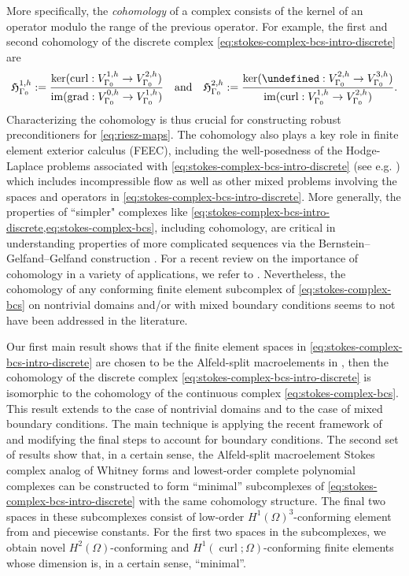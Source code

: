 \documentclass{mcom-l}
\theoremstyle{definition}
\theoremstyle{remark}
\numberwithin{equation}{section}
\let\div\undefined
\DeclareMathOperator{\curl}{curl}
\DeclareMathOperator{\grad}{grad}
\DeclareMathOperator{\div}{div}
\DeclareMathOperator{\image}{im}
\begin{document}
More specifically, the \textit{cohomology} of a complex consists of the kernel
of an operator modulo the range of the previous operator. For example,
the first and second cohomology of the discrete complex 
\cref{eq:stokes-complex-bcs-intro-discrete} are
\begin{align*}
	\mathfrak{H}^{1, h}_{\Gamma_0} := \frac{ \ker(\curl : V_{\Gamma_0}^{1, h} \to V_{\Gamma_0}^{2, h}) }{ 
		\image(\grad : V_{\Gamma_0}^{0, h} \to V_{\Gamma_0}^{1, h}) }
	\quad \text{and} \quad 
	\mathfrak{H}^{2, h}_{\Gamma_0} := \frac{ \ker(\div : V_{\Gamma_0}^{2, h} \to V_{\Gamma_0}^{3, h}) }{ 
		\image(\curl : V_{\Gamma_0}^{1, h} \to V_{\Gamma_0}^{2, h}) }.
\end{align*}
Characterizing the cohomology is thus crucial for constructing robust 
preconditioners for \cref{eq:riesz-maps}. The cohomology 
also plays a key role in finite element exterior calculus (FEEC),
including the well-posedness of the Hodge-Laplace problems associated with 
\cref{eq:stokes-complex-bcs-intro-discrete} 
(see e.g. \cite[Chapter 5.2]{Arnold18}) which includes incompressible flow
as well as other mixed problems involving the spaces and operators in 
\cref{eq:stokes-complex-bcs-intro-discrete}. More generally, 
the properties of ``simpler" complexes like
\cref{eq:stokes-complex-bcs-intro-discrete,eq:stokes-complex-bcs}, 
including cohomology, are critical in understanding properties of 
more complicated sequences via the Bernstein--Gelfand--Gelfand construction
\cite{ArnoldHu21,CapHu23,CapHu24}. For a recent review on the importance 
of cohomology in a variety of applications, we refer to \cite{Hu26}.
Nevertheless, the cohomology of any conforming finite element subcomplex
of \cref{eq:stokes-complex-bcs} on nontrivial domains and/or with mixed 
boundary conditions seems to not have been addressed in the literature.

Our first main result shows that if the finite element spaces 
in \cref{eq:stokes-complex-bcs-intro-discrete} are chosen to be the 
Alfeld-split macroelements in 
\cite{FuGuzmanNeilan20}, 
then the cohomology of the discrete complex
\cref{eq:stokes-complex-bcs-intro-discrete} is isomorphic to the cohomology
of the continuous complex \cref{eq:stokes-complex-bcs}. This result extends
\cite[Theorem 5.1]{FuGuzmanNeilan20} to the case of nontrivial domains 
and to the case of mixed boundary conditions. The main technique is 
applying the recent framework of \cite{HuLiangLin25} and modifying the final 
steps to account for boundary conditions. The second set of results show that,
in a certain sense, the Alfeld-split macroelement Stokes complex analog of 
Whitney forms 
\cite{Bossavit88a,Bossavit88b,Whitney57}
and lowest-order complete polynomial complexes can be constructed 
to form ``minimal'' subcomplexes of \cref{eq:stokes-complex-bcs-intro-discrete} 
with the same cohomology structure. The final two spaces in these subcomplexes
consist of low-order $H^1(\Omega)^3$-conforming element from 
\cite[Section 4]{GuzmanNeilan18} and piecewise constants.
For the first two spaces in the subcomplexes, we obtain novel 
$H^2(\Omega)$-conforming and $H^1(\curl; \Omega)$-conforming finite elements
whose dimension is, in a certain sense, ``minimal''.
\end{document}
